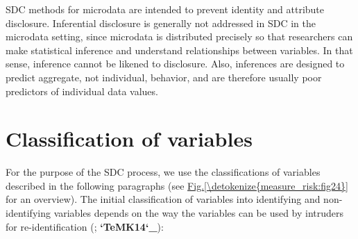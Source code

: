 \documentclass[letterpaper,10pt,english]{sphinxmanual}
\begin{document}
SDC methods for microdata are intended to prevent identity and attribute
disclosure. Inferential disclosure is generally not addressed in SDC in
the microdata setting, since microdata is distributed precisely so that
researchers can make statistical inference and understand relationships
between variables. In that sense, inference cannot be likened to
disclosure. Also, inferences are designed to predict aggregate, not
individual, behavior, and are therefore usually poor predictors of
individual data values.


\section{Classification of variables}
\label{\detokenize{measure_risk:classification-of-variables}}
For the purpose of the SDC process, we use the classifications of
variables described in the following paragraphs (see \hyperref[\detokenize{measure_risk:fig24}]{Fig.\@ \ref{\detokenize{measure_risk:fig24}}}
for an overview). The initial classification of variables into identifying and
non-identifying variables depends on the way the variables can be used
by intruders for re-identification ({\hyperref[\detokenize{measure_risk:hdfg12}]{}}; {\color{red}\bfseries{}{}`TeMK14{}`\_}):
\end{document}
